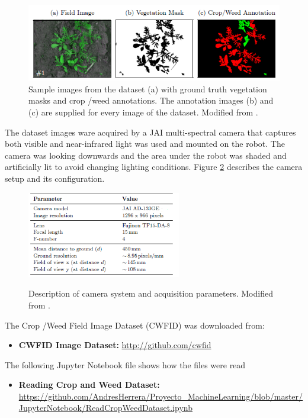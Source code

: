 \documentclass[12pt]{article}
\numberwithin{equation}{section}
\numberwithin{table}{section}
\numberwithin{figure}{section}
\begin{document}
\begin{figure}[H] \centering
	\includegraphics[width=1\textwidth]{image1.png}
	\caption{Sample images from the dataset (a) with ground truth vegetation masks
		and crop /weed annotations. The annotation images (b) and (c) are supplied for
		every image of the dataset. Modified from \cite{Haug2015}. }
	\label{figure1}
\end{figure}


\noindent
The dataset images ware acquired by a JAI multi-spectral camera that captures both visible and near-infrared light was used and mounted on the robot. The camera was looking downwards and the area under the robot was shaded and artificially lit to avoid changing lighting conditions. Figure \ref{figure2} describes the camera setup and its configuration.

\begin{figure}[H] \centering
	\caption{Description of camera system and acquisition parameters. Modified from \cite{Haug2015}. }
	\includegraphics[width=0.6\textwidth]{image2.png}
	\label{figure2}
\end{figure}

\noindent
The Crop /Weed Field Image Dataset (CWFID) was downloaded from:
\begin{itemize}
	\item {\textbf{CWFID Image Dataset:} } \url{http://github.com/cwfid}
	
\end{itemize}

\noindent
The following Jupyter Notebook file shows how the files were read 

\begin{itemize}
	\item {\textbf{Reading Crop and Weed Dataset:} } \url{https://github.com/AndresHerrera/Proyecto_MachineLearning/blob/master/JupyterNotebook/ReadCropWeedDataset.ipynb}
\end{itemize}
\end{document}

